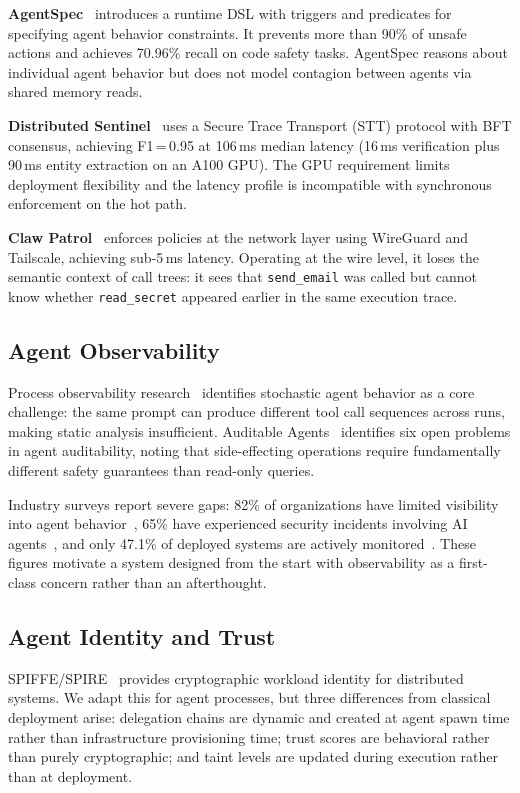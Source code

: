 \documentclass[conference]{IEEEtran}
\begin{document}
\textbf{AgentSpec}~\cite{agentspec2025} introduces a runtime DSL with
triggers and predicates for specifying agent behavior constraints. It
prevents more than 90\% of unsafe actions and achieves 70.96\% recall on
code safety tasks. AgentSpec reasons about individual agent behavior but
does not model contagion between agents via shared memory reads.

\textbf{Distributed Sentinel}~\cite{sentinel2026} uses a Secure Trace
Transport (STT) protocol with BFT consensus, achieving F1\,=\,0.95 at
106\,ms median latency (16\,ms verification plus 90\,ms entity extraction
on an A100 GPU). The GPU requirement limits deployment flexibility and the
latency profile is incompatible with synchronous enforcement on the hot path.

\textbf{Claw Patrol}~\cite{clawpatrol2026} enforces policies at the
network layer using WireGuard and Tailscale, achieving sub-5\,ms latency.
Operating at the wire level, it loses the semantic context of call trees:
it sees that \texttt{send\_email} was called but cannot know whether
\texttt{read\_secret} appeared earlier in the same execution trace.

\subsection{Agent Observability}

Process observability research~\cite{processobserv2025} identifies
stochastic agent behavior as a core challenge: the same prompt can produce
different tool call sequences across runs, making static analysis
insufficient. Auditable Agents~\cite{auditableagents2026} identifies six
open problems in agent auditability, noting that side-effecting operations
require fundamentally different safety guarantees than read-only queries.

Industry surveys report severe gaps: 82\% of organizations have limited
visibility into agent behavior~\cite{csa2025}, 65\% have experienced
security incidents involving AI agents~\cite{csa2025}, and only 47.1\% of
deployed systems are actively monitored~\cite{ibm2025}. These figures
motivate a system designed from the start with observability as a
first-class concern rather than an afterthought.

\subsection{Agent Identity and Trust}

SPIFFE/SPIRE~\cite{spiffe} provides cryptographic workload identity for
distributed systems. We adapt this for agent processes, but three
differences from classical deployment arise: delegation chains are dynamic
and created at agent spawn time rather than infrastructure provisioning
time; trust scores are behavioral rather than purely cryptographic; and
taint levels are updated during execution rather than at deployment.
\end{document}
